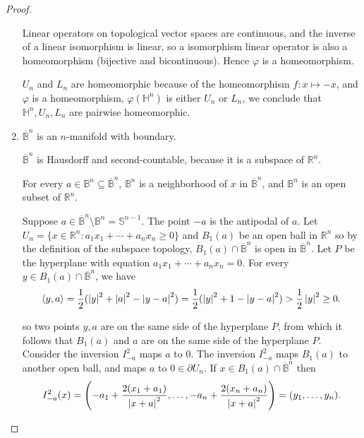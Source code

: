 \begin{proof}
\begin{enumerate}[label={\textbf{Step \arabic*.}},itemindent=1cm]
		      Linear operators on topological vector spaces are continuous, and the inverse of a linear isomorphism is linear, so a isomorphism linear operator is also a homeomorphism (bijective and bicontinuous). Hence $\varphi$ is a homeomorphism.

		      $U_{n}$ and $L_{n}$ are homeomorphic because of the homeomorphism $f: x\mapsto -x$, and $\varphi$ is a homeomorphism, $\varphi(\mathbb{H}^{n})$ is either $U_{n}$ or $L_{n}$, we conclude that $\mathbb{H}^{n}, U_{n}, L_{n}$ are pairwise homeomorphic.
		\item $\overline{\mathbb{B}}^{n}$ is an $n$-manifold with boundary.

		      $\overline{\mathbb{B}}^{n}$ is Hausdorff and second-countable, because it is a subspace of $\mathbb{R}^{n}$.

		      For every $a\in \mathbb{B}^{n}\subseteq\overline{\mathbb{B}}^{n}$, $\mathbb{B}^{n}$ is a neighborhood of $x$ in $\overline{\mathbb{B}}^{n}$, and $\mathbb{B}^{n}$ is an open subset of $\mathbb{R}^{n}$.

		      Suppose $a\in \overline{\mathbb{B}}^{n}\setminus\mathbb{B}^{n} = \mathbb{S}^{n-1}$. The point $-a$ is the antipodal of $a$. Let $U_{n} = \{ x\in\mathbb{R}^{n}: a_{1}x_{1} + \cdots + a_{n}x_{n} \geq 0 \}$ and $B_{1}(a)$ be an open ball in $\mathbb{R}^{n}$ so by the definition of the subspace topology, $B_{1}(a)\cap \overline{\mathbb{B}}^{n}$ is open in $\overline{\mathbb{B}}^{n}$. Let $P$ be the hyperplane with equation $a_{1}x_{1} + \cdots + a_{n}x_{n} = 0$. For every $y\in B_{1}(a)\cap \overline{\mathbb{B}}^{n}$, we have
		      \[
			      \left\langle{y, a}\right\rangle = \frac{1}{2}(\left\vert{y}\right\vert^{2} + \left\vert{a}\right\vert^{2} - \left\vert{y - a}\right\vert^{2}) = \frac{1}{2}(\left\vert{y}\right\vert^{2} + 1 - \left\vert{y - a}\right\vert^{2}) > \frac{1}{2}\left\vert{y}\right\vert^{2}\geq 0.
		      \]

		      so two points $y, a$ are on the same side of the hyperplane $P$, from which it follows that $B_{1}(a)$ and $a$ are on the same side of the hyperplane $P$. Consider the inversion $I^{2}_{-a}$ maps $a$ to $0$. The inversion $I^{2}_{-a}$ maps $B_{1}(a)$ to another open ball, and maps $a$ to $0\in \partial U_{n}$. If $x\in B_{1}(a) \cap\overline{\mathbb{B}}^{n}$ then
		      \[
			      I^{2}_{-a}(x) = \left( -a_{1} + \frac{2(x_{1} + a_{1})}{\left\vert{x + a}\right\vert^{2}}, \ldots, -a_{n} + \frac{2(x_{n} + a_{n})}{\left\vert{x + a}\right\vert^{2}} \right) = (y_{1}, \ldots, y_{n}).
		      \]


\end{enumerate}
\end{proof}
